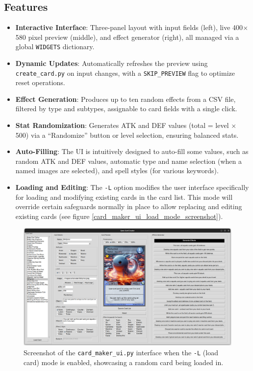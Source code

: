 \subsection{Features}
\begin{itemize}
	\item \textbf{Interactive Interface}: Three-panel layout with input fields (left), live 400$\times$580 pixel preview (middle), and effect generator (right), all managed via a global \texttt{WIDGETS} dictionary.
	\item \textbf{Dynamic Updates}: Automatically refreshes the preview using \texttt{create\_card.py} on input changes, with a \texttt{SKIP\_PREVIEW} flag to optimize reset operations.
	\item \textbf{Effect Generation}: Produces up to ten random effects from a CSV file, filtered by type and subtypes, assignable to card fields with a single click.
	\item \textbf{Stat Randomization}: Generates ATK and DEF values (total = level $\times$ 500) via a ``Randomize'' button or level selection, ensuring balanced stats.
 	\item \textbf{Auto-Filling}: The UI is intuitively designed to auto-fill some values, such as random ATK and DEF values, automatic type and name selection (when a named images are selected), and spell styles (for various keywords).
 	\item \textbf{Loading and Editing}: The \texttt{-L} option modifies the user interface specifically for loading and modifying existing cards in the card list. This mode will override certain safeguards normally in place to allow replacing and editing existing cards (see figure \ref{card_maker_ui_load_mode_screenshot}).
\end{itemize}

\begin{figure}[h]
	\centering
	\includegraphics[width=\textwidth]{images/ui_load_mode_sample.png}
	\caption{Screenshot of the \texttt{card\_maker\_ui.py} interface when the \texttt{-L} (load card) mode is enabled, showcasing a random card being loaded in.}
	\label{fig:card_maker_ui_load_mode_screenshot}
\end{figure}


